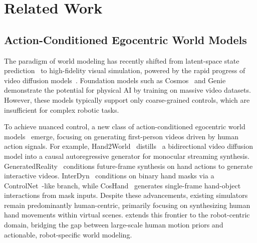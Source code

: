 \section{Related Work}
\subsection{Action-Conditioned Egocentric World Models}
The paradigm of world modeling has recently shifted from latent-space state prediction~\citep{ha2018world,assran2025v} to high-fidelity visual simulation, powered by the rapid progress of video diffusion models~\citep{kong2024hunyuanvideo,wang2025wan,yang2024cogvideox}.
Foundation models such as Cosmos~\citep{agarwal2025cosmos} and Genie~\citep{bruce2024genie} demonstrate the potential for physical AI by training on massive video datasets. However, these models typically support only coarse-grained controls, which are insufficient for complex robotic tasks.

To achieve nuanced control, a new class of action-conditioned egocentric world models~\citep{hao2026egosim,wang2026hand2world,xie2026generated,tu2025playerone,goswami2025world,pallotta2025egocontrol,gao2026lome} emerge, focusing on generating first-person videos driven by human action signals.
For example, Hand2World~\citep{wang2026hand2world} distills~\citep{yin2025slow,huang2025self} a bidirectional video diffusion model into a causal autoregressive generator for monocular streaming synthesis.
GeneratedReality~\citep{xie2026generated} conditions future-frame synthesis on hand actions to generate interactive videos. InterDyn~\citep{akkerman2025interdyn} conditions on binary hand masks via a ControlNet~\citep{zhang2023adding}-like branch, while CosHand~\citep{sudhakar2024controlling} generates single-frame hand-object interactions from mask inputs.
Despite these advancements, existing simulators remain predominantly human-centric, primarily focusing on synthesizing human hand movements within virtual scenes. 
\our extends this frontier to the robot-centric domain, bridging the gap between large-scale human motion priors and actionable, robot-specific world modeling.






